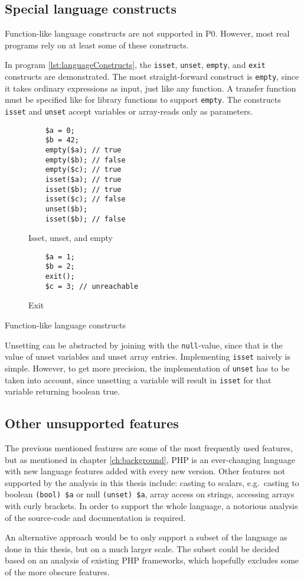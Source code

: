 \subsection{Special language constructs}

Function-like language constructs are not supported in P0. However, most real programs rely on at least some of these constructs. 

In program \ref{lst:languageConstructs}, the \texttt{isset}, \texttt{unset}, \texttt{empty}, and \texttt{exit} constructs are demonstrated. The most straight-forward construct is \texttt{empty}, since it takes ordinary expressions as input, just like any function. A transfer function must be specified like for library functions to support \texttt{empty}. The constructs \texttt{isset} and \texttt{unset} accept variables or array-reads only as parameters. 

\begin{program}
\begin{subfigure}[b]{.45\linewidth}
    \begin{lstlisting}
    $a = 0;
    $b = 42;
    empty($a); // true
    empty($b); // false
    empty($c); // true
    isset($a); // true
    isset($b); // true
    isset($c); // false
    unset($b);
    isset($b); // false
\end{lstlisting}
    \caption{Isset, unset, and empty}
\end{subfigure}
\begin{subfigure}[b]{.50\linewidth}
    \begin{lstlisting}
    $a = 1;
    $b = 2;
    exit();
    $c = 3; // unreachable
\end{lstlisting}
    \caption{Exit}
\end{subfigure}
\caption{Function-like language constructs}
\label{lst:languageConstructs}
\end{program}


Unsetting can be abstracted by joining with the \texttt{null}-value, since that is the value of unset variables and unset array entries. Implementing \texttt{isset} naively is simple. However, to get more precision, the implementation of \texttt{unset} has to be taken into account, since unsetting a variable will result in \texttt{isset} for that variable returning boolean true. 


\subsection{Other unsupported features}
The previous mentioned features are some of the most frequently used features, but as mentioned in chapter \ref{ch:background}, PHP is an ever-changing language with new language features added with every new version. Other features not supported by the analysis in this thesis include: casting to scalars, e.g.\ casting to boolean \texttt{(bool) \$a} or null \texttt{(unset) \$a}, array access on strings, accessing arrays with curly brackets. In order to support the whole language, a notorious analysis of the source-code and documentation is required. 

An alternative approach would be to only support a subset of the language as done in this thesis, but on a much larger scale. The subset could be decided based on an analysis of existing PHP frameworks, which hopefully excludes some of the more obscure features.





 